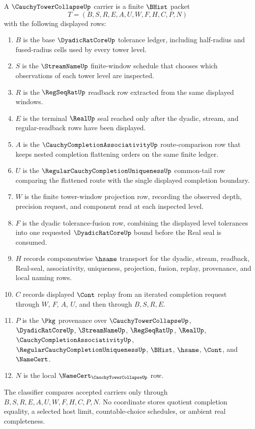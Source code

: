 \begin{definition}
\label{def:cauchy-tower-collapse-carrier}
A $\CauchyTowerCollapseUp$ carrier is a finite $\BHist$ packet
$$
T=(B,S,R,E,A,U,W,F,H,C,P,N)
$$
with the following displayed rows:
\begin{enumerate}
\item $B$ is the base $\DyadicRatCoreUp$ tolerance ledger, including half-radius and fused-radius cells used by every tower level.
\item $S$ is the $\StreamNameUp$ finite-window schedule that chooses which observations of each tower level are inspected.
\item $R$ is the $\RegSeqRatUp$ readback row extracted from the same displayed windows.
\item $E$ is the terminal $\RealUp$ seal reached only after the dyadic, stream, and regular-readback rows have been displayed.
\item $A$ is the $\CauchyCompletionAssociativityUp$ route-comparison row that keeps nested completion flattening orders on the same finite ledger.
\item $U$ is the $\RegularCauchyCompletionUniquenessUp$ common-tail row comparing the flattened route with the single displayed completion boundary.
\item $W$ is the finite tower-window projection row, recording the observed depth, precision request, and component read at each inspected level.
\item $F$ is the dyadic tolerance-fusion row, combining the displayed level tolerances into one requested $\DyadicRatCoreUp$ bound before the Real seal is consumed.
\item $H$ records componentwise $\hsame$ transport for the dyadic, stream, readback, Real-seal, associativity, uniqueness, projection, fusion, replay, provenance, and local naming rows.
\item $C$ records displayed $\Cont$ replay from an iterated completion request through $W$, $F$, $A$, $U$, and then through $B,S,R,E$.
\item $P$ is the $\Pkg$ provenance over $\CauchyTowerCollapseUp$, $\DyadicRatCoreUp$, $\StreamNameUp$, $\RegSeqRatUp$, $\RealUp$, $\CauchyCompletionAssociativityUp$, $\RegularCauchyCompletionUniquenessUp$, $\BHist$, $\hsame$, $\Cont$, and $\NameCert$.
\item $N$ is the local $\NameCert_{\CauchyTowerCollapseUp}$ row.
\end{enumerate}
The classifier compares accepted carriers only through $B,S,R,E,A,U,W,F,H,C,P,N$. No coordinate stores quotient completion equality, a selected host limit, countable-choice schedules, or ambient real completeness.
\end{definition}

